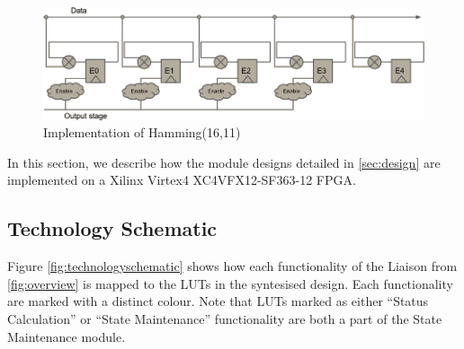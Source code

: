 
\begin{figure}
\includegraphics[width=15cm]{implementation/fig_ecc}
\caption{Implementation of Hamming(16,11)}
\label{fig:ecc}
\end{figure}

In this section, we describe how the module designs detailed in
\autoref{sec:design} are implemented on a Xilinx Virtex4 XC4VFX12-SF363-12 FPGA.

\subsection{Technology Schematic}
\label{sec:technologyschematic}

Figure \autoref{fig:technologyschematic} shows how each functionality of
the Liaison from \autoref{fig:overview} is mapped to the LUTs in the syntesised design.
Each functionality are marked with a distinct colour. Note that LUTs marked as either
``Status Calculation'' or ``State Maintenance'' functionality are both a part of the
State Maintenance module.


